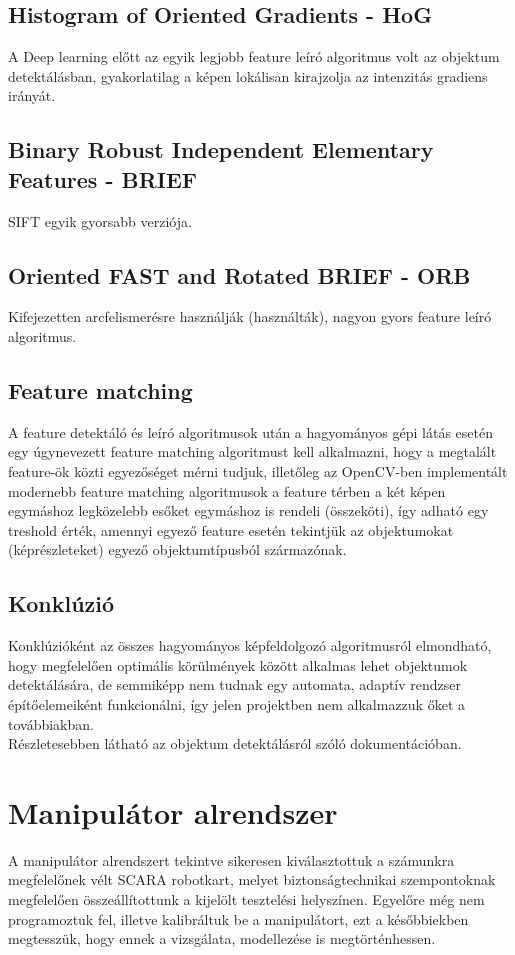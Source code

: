 \documentclass{article}
\begin{document}
 \subsection{Histogram of Oriented Gradients - HoG}
A Deep learning előtt az egyik legjobb feature leíró
algoritmus volt az objektum detektálásban, gyakorlatilag
a képen lokálisan kirajzolja az intenzitás gradiens irányát.
 \subsection{Binary Robust Independent Elementary Features - BRIEF}
 SIFT egyik gyorsabb verziója.
 \subsection{Oriented FAST and Rotated BRIEF - ORB}
Kifejezetten arcfelismerésre használják (használták), nagyon gyors feature leíró algoritmus.
 \subsection{Feature matching}
A feature detektáló és leíró algoritmusok után a hagyományos
gépi látás esetén egy úgynevezett feature matching algoritmust kell alkalmazni, hogy 
a megtalált feature-ök közti egyezőséget mérni tudjuk, illetőleg
az OpenCV-ben implementált modernebb feature matching algoritmusok 
a feature térben a két képen egymáshoz legközelebb esőket egymáshoz is rendeli (összeköti),
így adható egy treshold érték, amennyi egyező feature esetén tekintjük az objektumokat (képrészleteket)
egyező objektumtípusból származónak.
 \subsection{Konklúzió}
 Konklúzióként az összes hagyományos képfeldolgozó algoritmusról elmondható,
 hogy megfelelően optimális körülmények között alkalmas lehet
 objektumok detektálására, de semmiképp nem tudnak egy 
 automata, adaptív rendzser építőelemeiként funkcionálni, így
 jelen projektben nem alkalmazzuk őket a továbbiakban.\\[5pt]
 Részletesebben látható az objektum detektálásról szóló dokumentációban.

\section{Manipulátor alrendszer}
A manipulátor alrendszert tekintve sikeresen kiválasztottuk a számunkra megfelelőnek 
vélt SCARA robotkart, melyet biztonságtechnikai szempontoknak megfelelően összeállítottunk
a kijelölt tesztelési helyszínen. Egyelőre még nem programoztuk fel, illetve kalibráltuk be 
a manipulátort, ezt a későbbiekben megtesszük, hogy ennek a vizsgálata, modellezése is megtörténhessen.\vspace{5pt}\\
\end{document}
